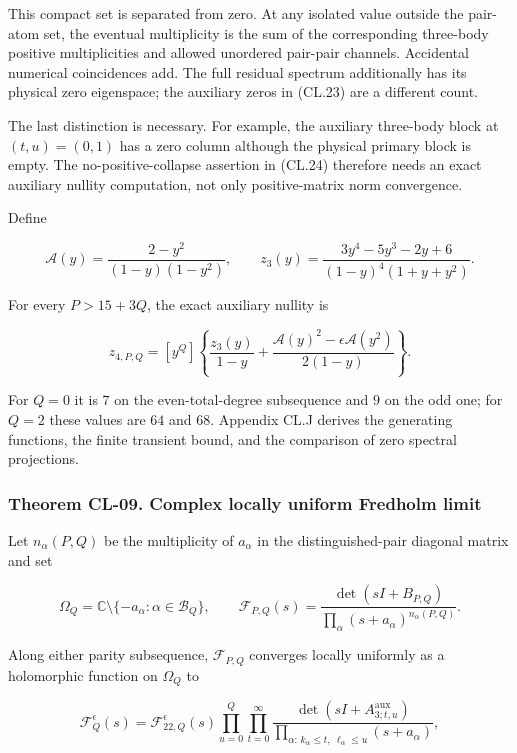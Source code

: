 This compact set is separated from zero. At any isolated value outside the pair-atom set, the eventual multiplicity is the sum of the corresponding three-body positive multiplicities and allowed unordered pair-pair channels. Accidental numerical coincidences add. The full residual spectrum additionally has its physical zero eigenspace; the auxiliary zeros in (CL.23) are a different count.

The last distinction is necessary. For example, the auxiliary three-body block at \((t,u)=(0,1)\) has a zero column although the physical primary block is empty. The no-positive-collapse assertion in (CL.24) therefore needs an exact auxiliary nullity computation, not only positive-matrix norm convergence.

Define

\[
\mathcal A(y)=\frac{2-y^2}{(1-y)(1-y^2)},\qquad
z_3(y)=\frac{3y^4-5y^3-2y+6}{(1-y)^4(1+y+y^2)}.
\]

For every \(P>15+3Q\), the exact auxiliary nullity is

\[
z_{4,P,Q}=[y^Q]\left\{
\frac{z_3(y)}{1-y}
+\frac{\mathcal A(y)^2-\epsilon\mathcal A(y^2)}{2(1-y)}
\right\}.
\tag{CL.25}
\]

For \(Q=0\) it is \(7\) on the even-total-degree subsequence and \(9\) on the odd one; for \(Q=2\) these values are \(64\) and \(68\). Appendix CL.J derives the generating functions, the finite transient bound, and the comparison of zero spectral projections.

\hypertarget{theorem-cl-09.-complex-locally-uniform-fredholm-limit}{%
\subsubsection{Theorem CL-09. Complex locally uniform Fredholm limit}\label{theorem-cl-09.-complex-locally-uniform-fredholm-limit}}

Let \(n_\alpha(P,Q)\) be the multiplicity of \(a_\alpha\) in the distinguished-pair diagonal matrix and set

\[
\Omega_Q=\mathbb C\setminus\{-a_\alpha:\alpha\in\mathcal B_Q\},
\qquad
\mathcal F_{P,Q}(s)=
\frac{\det(sI+B_{P,Q})}{\prod_\alpha(s+a_\alpha)^{n_\alpha(P,Q)}}.
\tag{CL.26}
\]

Along either parity subsequence, \(\mathcal F_{P,Q}\) converges locally uniformly as a holomorphic function on \(\Omega_Q\) to

\[
\mathcal F_Q^\epsilon(s)=
\mathcal F_{22,Q}^\epsilon(s)
\prod_{u=0}^Q\prod_{t=0}^{\infty}
\frac{\det(sI+A_{3;t,u}^{\mathrm{aux}})}
{\prod_{\alpha:\,k_\alpha\leq t,\ \ell_\alpha\leq u}(s+a_\alpha)},
\tag{CL.27}
\]

